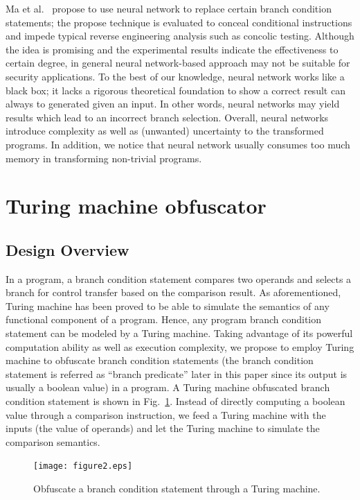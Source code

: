 \documentclass[lnicst]{svmultln}
\newcommand{\F}{Fig.}
\begin{document}
Ma et al.~\cite{Ma, Maieee} propose to use neural network to replace certain
branch condition statements; the propose technique is evaluated to conceal
conditional instructions and impede typical reverse engineering analysis such as
concolic testing. Although the idea is promising and the experimental results
indicate the effectiveness to certain degree, in general neural network-based
approach may not be suitable for security applications. To the best of our
knowledge, neural network works like a black box; it lacks a rigorous
theoretical foundation to show a correct result can always to generated given an
input. In other words, neural networks may yield results which lead to an
incorrect branch selection. Overall, neural networks introduce complexity as
well as (unwanted) uncertainty to the transformed programs. In addition, we
notice that neural network usually consumes too much memory in transforming
non-trivial programs.

%
\section{Turing machine obfuscator}
%
\subsection{Design Overview}
In a program, a branch condition statement compares two operands and selects a
branch for control transfer based on the comparison result. As aforementioned,
Turing machine has been proved to be able to simulate the semantics of any
functional component of a program. Hence, any program branch condition statement
can be modeled by a Turing machine. Taking advantage of its powerful computation
ability as well as execution complexity, we propose to employ Turing machine to
obfuscate branch condition statements (the branch condition statement is
referred as ``branch predicate'' later in this paper since its output is usually
a boolean value) in a program. A Turing machine obfuscated branch condition
statement is shown in \F~\ref{fig:two}. Instead of directly computing a boolean
value through a comparison instruction, we feed a Turing machine with the inputs
(the value of operands) and let the Turing machine to simulate the comparison
semantics.

\begin{figure}
 \texttt{[image: figure2.eps]}
 \caption{Obfuscate a branch condition statement through a Turing machine.}
 \label{fig:two}
\end{figure}
\end{document}
